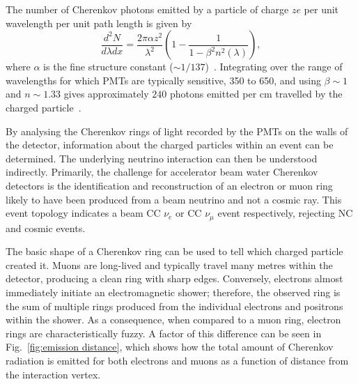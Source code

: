 The number of Cherenkov photons emitted by a particle of charge $ze$ per unit wavelength per unit
path length is given by
\begin{equation}
    \frac{d^{2}N}{d\lambda dx}=\frac{2\pi\alpha z^{2}}{\lambda^{2}}
    \left(1-\frac{1}{1-\beta^{2}n^{2}(\lambda)}\right),
    \label{eq:cherenkov_emission}
\end{equation}
where $\alpha$ is the fine structure constant ($\sim1/137$)~\cite{particle2020}. Integrating over
the range of wavelengths for which PMTs are typically sensitive, \unit{350}{} to
\unit{650}{}, and using $\beta\sim 1$ and $n\sim 1.33$ gives approximately $240$ photons
emitted per cm travelled by the charged particle~\cite{perch2017}.

By analysing the Cherenkov rings of light recorded by the PMTs on the walls of the detector,
information about the charged particles within an event can be determined. The underlying neutrino
interaction can then be understood indirectly. Primarily, the challenge for accelerator beam water
Cherenkov detectors is the identification and reconstruction of an electron or muon ring likely to
have been produced from a beam neutrino and not a cosmic ray. This event topology indicates a beam
CC $\nu_{e}$ or CC $\nu_{\mu}$ event respectively, rejecting NC and cosmic events.

The basic shape of a Cherenkov ring can be used to tell which charged particle created it. Muons
are long-lived and typically travel many metres within the detector, producing a clean ring with
sharp edges. Conversely, electrons almost immediately initiate an electromagnetic shower;
therefore, the observed ring is the sum of multiple rings produced from the individual electrons
and positrons within the shower. As a consequence, when compared to a muon ring, electron rings
are characteristically fuzzy. A factor of this difference can be seen in Fig.~\ref{fig:emission
distance}, which shows how the total amount of Cherenkov radiation is emitted for both electrons
and muons as a function of distance from the interaction vertex.

